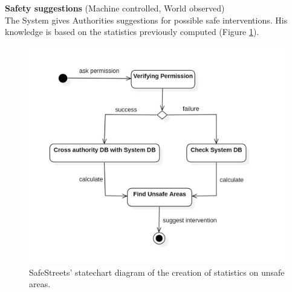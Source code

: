 \documentclass{report}
\begin{document}
\noindent\textbf{Safety suggestions} (Machine controlled, World observed)\\
The System gives Authorities suggestions for possible safe interventions. His knowledge is based on the statistics previously computed (Figure \ref{fig:State2}).

\begin{figure}[!ht]
\begin{center}
\includegraphics[width=.8\textwidth]{./img/img_UnsafeAreas.jpg}
\end{center}
\caption{SafeStreets' statechart diagram of the creation of statistics on unsafe areas.}
\label{fig:State2}
\end{figure}
\newpage
\end{document}
